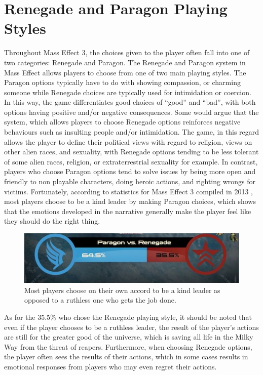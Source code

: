 \documentclass[journal]{IEEEtran}
\begin{document}
\section{Renegade and Paragon Playing Styles}
Throughout Mass Effect 3, the choices given to the player often fall into one
of two categories: Renegade and Paragon. The Renegade and Paragon system in
Mass Effect allows players to choose from one of two main playing styles.
The Paragon options typically have to do with showing compassion, or charming someone while Renegade choices are typically used for intimidation or coercion.
In this way, the game differentiates good choices of ``good'' and ``bad'',
with both options having positive and/or negative consequences.
Some would argue that the system, which allows players to choose Renegade options reinforces negative behaviours such as insulting people and/or intimidation. The game, in this regard allows the player to define their political views with regard to religion, views on other alien races,
and sexuality, with Renegade options tending to be less tolerant of some
alien races, religion, or extraterrestrial sexuality for example.
In contrast, players who choose Paragon options tend to solve issues by being more open and friendly to non playable characters, doing heroic actions, and
righting wrongs for  victims. Fortunately, according to
statistics for Mass Effect 3 compiled in 2013 \cite{ea}, most players choose
to be a kind leader by making Paragon choices, which shows that the emotions
developed in the narrative generally make the player feel like they should
do the right thing.

\begin{figure}[h!]
 \centering
 \includegraphics[width=.485\textwidth]{paragon}
 \caption{Most players choose on their own accord to be a kind leader as opposed to a ruthless one who gets the job done. \cite{ea}}
\end{figure}

As for the 35.5\% who chose the Renegade playing style, it should be noted that even if the player chooses to be a ruthless leader, the result of the player's actions are still for the greater good of the universe, which is saving
all life in the Milky Way from the threat of reapers. Furthermore, when choosing Renegade options, the player often sees the results of their actions,
which in some cases results in emotional responses from players who may even regret their actions.
\end{document}
